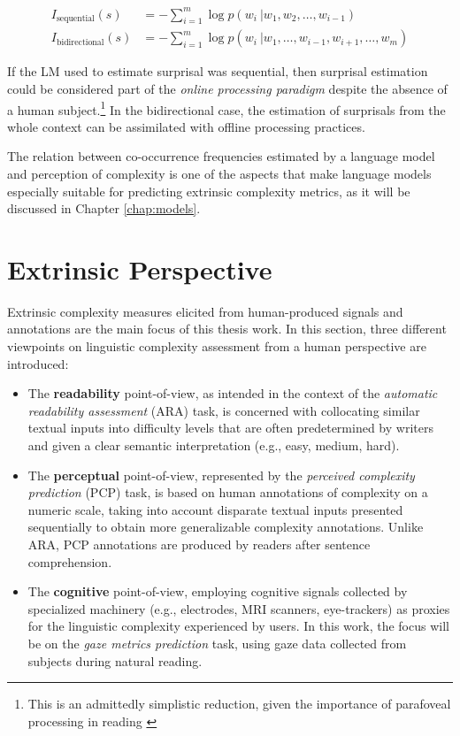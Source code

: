 \documentclass[a4paper, nobind]{templates/ociamthesis}
\begin{document}
\begin{equation}
\begin{split}
I_{\mathrm{sequential}}(s) & = - \sum_{i=1}^m \log p(w_i \ | w_1, w_2, \dots, w_{i-1})\\
I_{\mathrm{bidirectional}}(s) & = - \sum_{i=1}^m \log p(w_i \ | w_1, \dots, w_{i-1}, w_{i+1}, \dots, w_m)
\end{split}
\label{eq:sent-surprisal-cases}
\end{equation}

If the LM used to estimate surprisal was sequential, then surprisal estimation could be considered part of the \emph{online processing paradigm} despite the absence of a human subject.\footnote{This is an admittedly simplistic reduction, given the importance of parafoveal processing in reading \autocites{schotter-2012-parafoveal}{schotter-2018-reading}} In the bidirectional case, the estimation of surprisals from the whole context can be assimilated with offline processing practices.

The relation between co-occurrence frequencies estimated by a language model and perception of complexity is one of the aspects that make language models especially suitable for predicting extrinsic complexity metrics, as it will be discussed in Chapter \ref{chap:models}.

\hypertarget{subchap:extrinsic}{%
\section{Extrinsic Perspective}\label{subchap:extrinsic}}

Extrinsic complexity measures elicited from human-produced signals and annotations are the main focus of this thesis work. In this section, three different viewpoints on linguistic complexity assessment from a human perspective are introduced:

\begin{itemize}
\item
  The \textbf{readability} point-of-view, as intended in the context of the \emph{automatic readability assessment} (ARA) task, is concerned with collocating similar textual inputs into difficulty levels that are often predetermined by writers and given a clear semantic interpretation (e.g., easy, medium, hard).
\item
  The \textbf{perceptual} point-of-view, represented by the \emph{perceived complexity prediction} (PCP) task, is based on human annotations of complexity on a numeric scale, taking into account disparate textual inputs presented sequentially to obtain more generalizable complexity annotations. Unlike ARA, PCP annotations are produced by readers after sentence comprehension.
\item
  The \textbf{cognitive} point-of-view, employing cognitive signals collected by specialized machinery (e.g., electrodes, MRI scanners, eye-trackers) as proxies for the linguistic complexity experienced by users. In this work, the focus will be on the \emph{gaze metrics prediction} task, using gaze data collected from subjects during natural reading.
\end{itemize}
\end{document}
